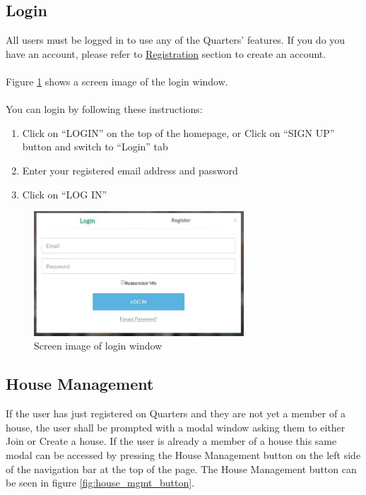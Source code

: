 \documentclass[12pt]{article}
\begin{document}
    \subsection{Login}
    All users must be logged in to use any of the Quarters' features. If you do you have an account, please refer to \hyperref[sec:registration]{Registration} section to create an account. \\\\
    Figure \ref{fig:login} shows a screen image of the login window.\\\\
    You can login by following these instructions:
    \begin{enumerate}
        \item Click on ``LOGIN'' on the top of the homepage, or Click on ``SIGN UP'' button and switch to ``Login'' tab
        \item Enter your registered email address and password
        \item Click on ``LOG IN''
    \end{enumerate}
    \begin{figure}
        \centering
        \includegraphics[width=0.7\textwidth]{login}
        \caption{Screen image of login window}
        \label{fig:login}
    \end{figure}
    \subsection{House Management} %
    \label{sec:housemanagement}
    If the user has just registered on Quarters and they are not yet a member of a house, the user shall be prompted with a modal window asking them to either Join or Create a house. If the user is already a member of a house this same modal can be accessed by pressing the House Management button on the  left side of the navigation bar at the top of the page. The House Management button can be seen in figure \ref{fig:house_mgmt_button}.
    
\end{document}
